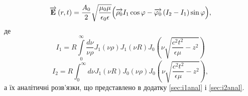 %
\begin{equation} \label{eq:linear_e_cyl}
\overrightarrow{\mathbf E} \left( r, t \right) = \frac{A_0}{2} 
\sqrt{\frac{\mu_0 \mu}{\epsilon_0 \epsilon}}
\Big( \overrightarrow{\mathbf \rho_0} I_1 \cos \varphi - 
\overrightarrow{\mathbf  \varphi_0 } \left( I_2 - I_1 \right) \sin \varphi \Big),
\end{equation}
%
де
%
\begin{equation*}
I_1 = R \int \limits_{0}^{\infty} \frac{d \nu}{\nu \rho} J_1 (\nu \rho) 
J_1 (\nu R) J_0 \left( \nu \sqrt{\frac{c^2 t^2}{\epsilon \mu} - z^2} \right)
\end{equation*}
%
\begin{equation*}
I_2 = R \int_{0}^{\infty} d \nu J_1 (\nu R) J_0 (\nu \rho) 
J_0 \left( \nu \sqrt{\frac{c^2 t^2}{\epsilon \mu} - z^2} \right),
\end{equation*}
%
а їх аналітичні розв'язки, що представлено в додатку \ref{sec:i1anal} і 
\ref{sec:i2anal}.

